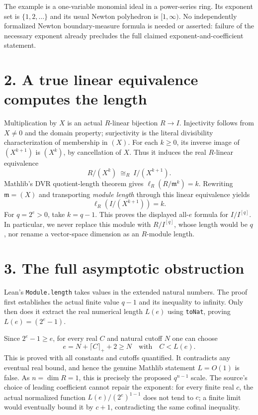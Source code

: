 \documentclass[10pt]{article}
\begin{document}
The example is a one-variable monomial ideal in a power-series ring. Its exponent set is $\{1,2,\ldots\}$ and its usual Newton polyhedron is $[1,\infty)$. No independently formalized Newton boundary-measure formula is needed or asserted: failure of the necessary exponent already precludes the full claimed exponent-and-coefficient statement.

\section*{2. A true linear equivalence computes the length}
Multiplication by $X$ is an actual $R$-linear bijection $R\to I$. Injectivity follows from $X\ne0$ and the domain property; surjectivity is the literal divisibility characterization of membership in $(X)$. For each $k\ge0$, its inverse image of $(X^{k+1})$ is $(X^k)$, by cancellation of $X$. Thus it induces the real $R$-linear equivalence
\[
 R/(X^k)\ \cong_R\ I/(X^{k+1}).
\]
Mathlib's DVR quotient-length theorem gives $\ell_R(R/\mathfrak m^k)=k$. Rewriting $\mathfrak m=(X)$ and transporting \emph{module length} through this linear equivalence yields
\[
 \ell_R(I/(X^{k+1}))=k.
\]
For $q=2^e>0$, take $k=q-1$. This proves the displayed all-$e$ formula for $I/I^{[q]}$. In particular, we never replace this module with $R/I^{[q]}$, whose length would be $q$, nor rename a vector-space dimension as an $R$-module length.

\newpage
\section*{3. The full asymptotic obstruction}
Lean's \texttt{Module.length} takes values in the extended natural numbers. The proof first establishes the actual finite value $q-1$ and its inequality to infinity. Only then does it extract the real numerical length $L(e)$ using \texttt{toNat}, proving $L(e)=(2^e-1)$.

Since $2^e-1\ge e$, for every real $C$ and natural cutoff $N$ one can choose
\[
 e=N+\lceil C\rceil_+ +2\ge N
 \quad\text{with}\quad C<L(e).
\]
This is proved with all constants and cutoffs quantified. It contradicts any eventual real bound, and hence the genuine Mathlib statement $L=O(1)$ is false. As $n=\dim R=1$, this is precisely the proposed $q^{n-1}$ scale. The source's choice of leading coefficient cannot repair the exponent: for every finite real $c$, the actual normalized function $L(e)/(2^e)^{1-1}$ does not tend to $c$; a finite limit would eventually bound it by $c+1$, contradicting the same cofinal inequality.
\end{document}
